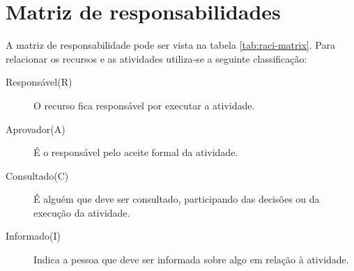 \chapter{Matriz de responsabilidades}
\label{ch:raci-matrix}

A matriz de responsabilidade pode ser vista na tabela \ref{tab:raci-matrix}. Para relacionar os recursos e as atividades utiliza-se a seguinte classificação:

\begin{description}
	\item[Responsável(R)] O recurso fica responsável por executar a atividade.
	\item[Aprovador(A)] É o responsável pelo aceite formal da atividade.
	\item[Consultado(C)] É alguém que deve ser consultado, participando das decisões ou da execução da atividade.
	\item[Informado(I)] Indica a pessoa que deve ser informada sobre algo em relação à atividade.
\end{description}

